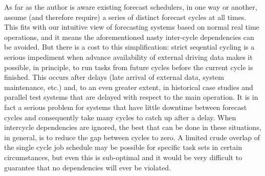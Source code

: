 \documentclass[11pt,a4paper]{article}
\begin{document}
As far as the author is aware existing forecast schedulers, in one
way or another, assume (and therefore require) a series of distinct
forecast cycles at all times. This fits with our intuitive view of
forecasting systems based on normal real time operations, and it means
the aforementioned nasty inter-cycle dependencies can be avoided. But
there is a cost to this simplification: strict seqential cycling is a
serious impediment when advance availability of external driving data
makes it possible, in principle, to run tasks from future cycles before
the current cycle is finished.  This occurs after delays (late arrival
of external data, system maintenance, etc.) and, to an even greater
extent, in historical case studies and parallel test systems that are
delayed with respect to the main operation. It is in fact a serious
problem for systems that have little downtime between forecast cycles
and consequently take many cycles to catch up after a delay. When
intercycle dependencies are ignored, the best that can be done in these
situations, in general, is to reduce the gap between cycles to zero. A
limited crude overlap of the single cycle job schedule may be possible
for specific task sets in certain circumstances, but even this is
sub-optimal and it would be very difficult to guarantee that no
dependencies will ever be violated.
\end{document}
